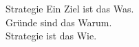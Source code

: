 

\begin{frame}[c]{Strategie}
    \Large
    Ein Ziel ist das Was. \\
    Gründe sind das Warum. \\
    \pause
    Strategie ist das Wie.
\end{frame}



